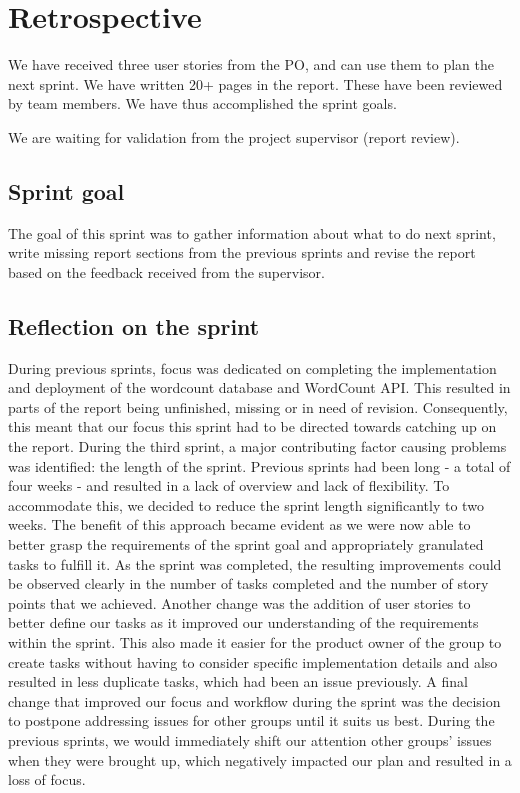 \section{Retrospective}
We have received three user stories from the PO, and can use them to plan the next sprint.  We have written 20+ pages in the report. These have been reviewed by team members.  We have thus accomplished the sprint goals. 

We are waiting for validation from the project supervisor (report review).

\subsection{Sprint goal}
The goal of this sprint was to gather information about what to do next sprint, write missing report sections from the previous sprints and revise the report based on the feedback received from the supervisor. 

\subsection{Reflection on the sprint}
During previous sprints, focus was dedicated on completing the implementation and deployment of the wordcount database and WordCount API. This resulted in parts of the report being unfinished, missing or in need of revision. Consequently, this meant that our focus this sprint had to be directed towards catching up on the report.
During the third sprint, a major contributing factor causing problems was identified: the length of the sprint. Previous sprints had been long - a total of four weeks - and resulted in a lack of overview and lack of flexibility. To accommodate this, we decided to reduce the sprint length significantly to two weeks. The benefit of this approach became evident as we were now able to better grasp the requirements of the sprint goal and appropriately granulated tasks to fulfill it. As the sprint was completed, the resulting improvements could be observed clearly in the number of tasks completed and the number of story points that we achieved. 
Another change was the addition of user stories to better define our tasks as it improved our understanding of the requirements within the sprint. This also made it easier for the product owner of the group to create tasks without having to consider specific implementation details and also resulted in less duplicate tasks, which had been an issue previously.
A final change that improved our focus and workflow during the sprint was the decision to postpone addressing issues for other groups until it suits us best. During the previous sprints, we would immediately shift our attention other groups' issues when they were brought up, which negatively impacted our plan and resulted in a loss of focus.

